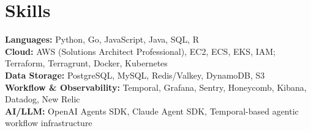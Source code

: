 \documentclass[letterpaper,10pt]{extarticle}
\begin{document}
\section{Skills}
\begin{itemize}[leftmargin=0.1in, label={}, topsep=2pt, itemsep=1pt, parsep=0pt]
  \small{\item{
    \textbf{Languages:} Python, Go, JavaScript, Java, SQL, R \\
    \textbf{Cloud:} AWS (Solutions Architect Professional), EC2, ECS, EKS, IAM; Terraform, Terragrunt, Docker, Kubernetes \\
    \textbf{Data Storage:} PostgreSQL, MySQL, Redis/Valkey, DynamoDB, S3 \\
    \textbf{Workflow \& Observability:} Temporal, Grafana, Sentry, Honeycomb, Kibana, Datadog, New Relic \\
    \textbf{AI/LLM:} OpenAI Agents SDK, Claude Agent SDK, Temporal-based agentic workflow infrastructure
  }}
\end{itemize}
\end{document}
